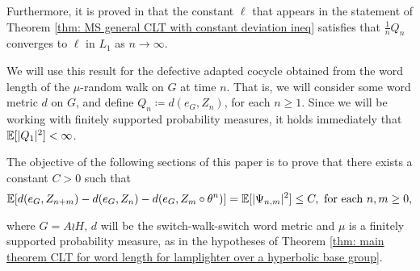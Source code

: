Furthermore, it is proved in \cite[Theorem 3.3]{MathieuSisto2020} that the constant $\ell$ that appears in the statement of Theorem \ref{thm: MS general CLT with constant deviation ineq} satisfies that $\frac{1}{n}Q_n$ converges to $\ell$ in $L_1$ as $n\to \infty$.  


We will use this result for the defective adapted cocycle obtained from the word length of the $\mu$-random walk on $G$ at time $n$. That is, we will consider some word metric $d$ on $G$, and define $Q_n\coloneqq d(e_G,Z_n)$, for each $n\ge 1$. Since we will be working with finitely supported probability measures, it holds immediately that $\mathbb{E}[|Q_1|^2]<\infty$. 


The objective of the following sections of this paper is to prove that there exists a constant $C>0$ such that
\[
\mathbb{E}[d(e_G,Z_{n+m})-d(e_G,Z_n)-d(e_G,Z_m\circ \theta^n)]=\mathbb{E}[|\Psi_{n,m}|^2]\le C, \text{ for each }n,m\ge 0,
\]

where $G=A\wr H$, $d$ will be the switch-walk-switch word metric and $\mu$ is a finitely supported probability measure, as in the hypotheses of Theorem \ref{thm: main theorem CLT for word length for lamplighter over a hyperbolic base group}.
